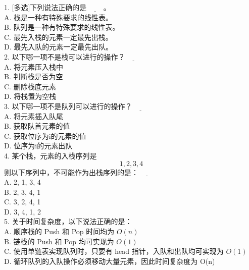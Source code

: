 %
%
    1. [多选]下列说法正确的是$\underline{\hspace{1cm}}$。\\
A. 栈是一种有特殊要求的线性表。\\
B. 队列是一种有特殊要求的线性表。\\
C. 最先入栈的元素一定最先出栈。\\
D. 最先入队的元素一定最先出队。\\

    2. 以下哪一项不是栈可以进行的操作？$\underline{\hspace{1cm}}$\\
A. 将元素压入栈中\\
B. 判断栈是否为空\\
C. 删除栈底元素\\
D. 将栈置为空栈\\

    3. 以下哪一项不是队列可以进行的操作？$\underline{\hspace{1cm}}$\\
A. 将元素插入队尾\\
B. 获取队首元素的值\\
C. 获取位序为i的元素的值\\
D. 位序为i的元素出队\\

    4. 某个栈，元素的入栈序列是 $$ 1,2,3,4 $$ 则以下序列中，不可能作为出栈序列的是：$\underline{\hspace{1cm}}$\\
A. 2, 1, 3, 4\\
B. 2, 3, 4, 1\\
C. 3, 2, 4, 1\\
D. 3, 4, 1, 2\\

    5. 关于时间复杂度，以下说法正确的是：\\
A. 顺序栈的 Push 和 Pop 时间均为 \(O(n)\)\\
B. 链栈的 Push 和 Pop 均可实现为 \(O(1)\)\\
C. 使用单链表实现队列时，只要有 head 指针，入队和出队均可实现为 \(O(1)\)\\
D. 循环队列的入队操作必须移动大量元素，因此时间复杂度为 O(n)\\

